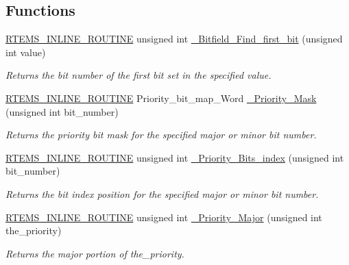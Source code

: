 \subsection*{Functions}
\begin{DoxyCompactItemize}
\item 
\mbox{\hyperlink{group__RTEMSScoreBaseDefs_gac216239df231d5dbd15e3520b0b9313f}{R\+T\+E\+M\+S\+\_\+\+I\+N\+L\+I\+N\+E\+\_\+\+R\+O\+U\+T\+I\+NE}} unsigned int \mbox{\hyperlink{group__RTEMSScorePriority_gacf3f0ba39c90e26e3f821c04a2e48ee5}{\+\_\+\+Bitfield\+\_\+\+Find\+\_\+first\+\_\+bit}} (unsigned int value)
\begin{DoxyCompactList}\small\item\em Returns the bit number of the first bit set in the specified value. \end{DoxyCompactList}\item 
\mbox{\hyperlink{group__RTEMSScoreBaseDefs_gac216239df231d5dbd15e3520b0b9313f}{R\+T\+E\+M\+S\+\_\+\+I\+N\+L\+I\+N\+E\+\_\+\+R\+O\+U\+T\+I\+NE}} Priority\+\_\+bit\+\_\+map\+\_\+\+Word \mbox{\hyperlink{group__RTEMSScorePriority_gadf554c1cf4e5a358ebb28e90e013ccb1}{\+\_\+\+Priority\+\_\+\+Mask}} (unsigned int bit\+\_\+number)
\begin{DoxyCompactList}\small\item\em Returns the priority bit mask for the specified major or minor bit number. \end{DoxyCompactList}\item 
\mbox{\hyperlink{group__RTEMSScoreBaseDefs_gac216239df231d5dbd15e3520b0b9313f}{R\+T\+E\+M\+S\+\_\+\+I\+N\+L\+I\+N\+E\+\_\+\+R\+O\+U\+T\+I\+NE}} unsigned int \mbox{\hyperlink{group__RTEMSScorePriority_ga7e9cb59c60f7231a454824509f3a1b6a}{\+\_\+\+Priority\+\_\+\+Bits\+\_\+index}} (unsigned int bit\+\_\+number)
\begin{DoxyCompactList}\small\item\em Returns the bit index position for the specified major or minor bit number. \end{DoxyCompactList}\item 
\mbox{\hyperlink{group__RTEMSScoreBaseDefs_gac216239df231d5dbd15e3520b0b9313f}{R\+T\+E\+M\+S\+\_\+\+I\+N\+L\+I\+N\+E\+\_\+\+R\+O\+U\+T\+I\+NE}} unsigned int \mbox{\hyperlink{group__RTEMSScorePriority_ga1e9fd447bd6120ec504a82d5e4f4dc24}{\+\_\+\+Priority\+\_\+\+Major}} (unsigned int the\+\_\+priority)
\begin{DoxyCompactList}\small\item\em Returns the major portion of the\+\_\+priority. \end{DoxyCompactList}\item 

\end{DoxyCompactItemize}
